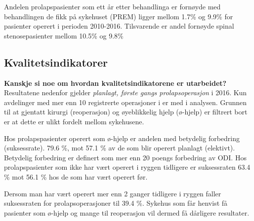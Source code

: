 \documentclass [norsk,a4paper,twoside]{article}\usepackage[]{graphicx}\usepackage[]{color}
\begin{document}
Andelen prolapspasienter som ett år etter behandlinga er fornøyde med behandlingen de fikk på sykehuset (PREM) ligger mellom 1.7\% og 9.9\% for pasienter operert i perioden 2010-2016. Tilsvarende er andel fornøyde spinal stenosepasienter mellom 10.5\% og 9.8\%

\subsection{Kvalitetsindikatorer}

\textbf{Kanskje si noe om hvordan kvalitetsindikatorene er utarbeidet?}\\ 




Resultatene nedenfor gjelder  \textit{planlagt, første gangs prolapsoperasjon} i 2016. 
Kun avdelinger med mer enn 10 registrerte operasjoner i er med i
analysen. Grunnen til at gjentatt kirurgi (reoperasjon) og øyeblikkelig hjelp (ø-hjelp)
er filtrert bort er at dette er ulikt fordelt mellom sykehusene.


Hos prolapspasienter operert som ø-hjelp er andelen med betydelig forbedring (suksessrate).  79.6 \%, mot 57.1 \% av de som blir operert planlagt (elektivt). Betydelig forbedring er definert som mer enn 20 poengs forbedring av ODI.
Hos prolapspasienter som ikke har vært operert i ryggen tidligere er suksessraten 63.4 \% mot 56.1 \%
hos de som har vært operert før. 

Dersom man har vært operert mer enn 2 ganger tidligere i
ryggen faller suksessraten for prolapsoperasjoner til 39.4 \%. Sykehus som får henvist få pasienter som ø-hjelp og
mange til reoperasjon vil dermed få dårligere resultater.
\end{document}
